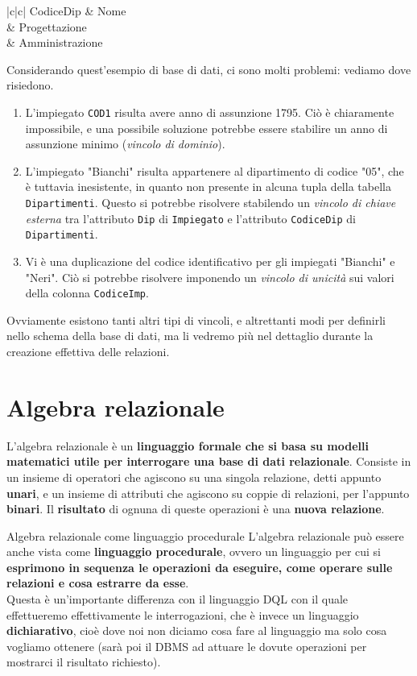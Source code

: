 \documentclass[12pt]{report}
\begin{document}
	\begin{tabella}{|c|c|}
		CodiceDip & Nome\\ & Progettazione\\ & Amministrazione\\
	\end{tabella}
	
	Considerando quest'esempio di base di dati, ci sono molti problemi: vediamo dove risiedono.
	\begin{enumerate}
		\item L'impiegato \texttt{COD1} risulta avere anno di assunzione 1795. Ciò è chiaramente impossibile, e una possibile soluzione potrebbe essere stabilire un anno di assunzione minimo (\textit{vincolo di dominio}).
		
		\item L'impiegato "Bianchi" risulta appartenere al dipartimento di codice "05", che è tuttavia inesistente, in quanto non presente in alcuna tupla della tabella \texttt{Dipartimenti}. Questo si potrebbe risolvere stabilendo un \textit{vincolo di chiave esterna} tra l'attributo \texttt{Dip} di \texttt{Impiegato} e l'attributo \texttt{CodiceDip} di \texttt{Dipartimenti}.
		
		\item Vi è una duplicazione del codice identificativo per gli impiegati "Bianchi" e "Neri". Ciò si potrebbe risolvere imponendo un \textit{vincolo di unicità} sui valori della colonna \texttt{CodiceImp}.
	\end{enumerate}
	Ovviamente esistono tanti altri tipi di vincoli, e altrettanti modi per definirli nello schema della base di dati, ma li vedremo più nel dettaglio durante la creazione effettiva delle relazioni.
	
	\chapter{Algebra relazionale}
	L'algebra relazionale è un \textbf{linguaggio formale che si basa su modelli matematici utile per interrogare una base di dati relazionale}. Consiste in un insieme di operatori che agiscono su una singola relazione, detti appunto \textbf{unari}, e un insieme di attributi che agiscono su coppie di relazioni, per l'appunto \textbf{binari}. Il \textbf{risultato} di ognuna di queste operazioni è una \textbf{nuova relazione}.
	
	\begin{osservazione}{Algebra relazionale come linguaggio procedurale}{}
		L'algebra relazionale può essere anche vista come \textbf{linguaggio procedurale}, ovvero un linguaggio per cui si \textbf{esprimono in sequenza le operazioni da eseguire, come operare sulle relazioni e cosa estrarre da esse}.\\
		Questa è un'importante differenza con il linguaggio DQL con il quale effettueremo effettivamente le interrogazioni, che è invece un linguaggio \textbf{dichiarativo}, cioè dove noi non diciamo cosa fare al linguaggio ma solo cosa vogliamo ottenere (sarà poi il DBMS ad attuare le dovute operazioni per mostrarci il risultato richiesto).
	\end{osservazione}
	
\end{document}
